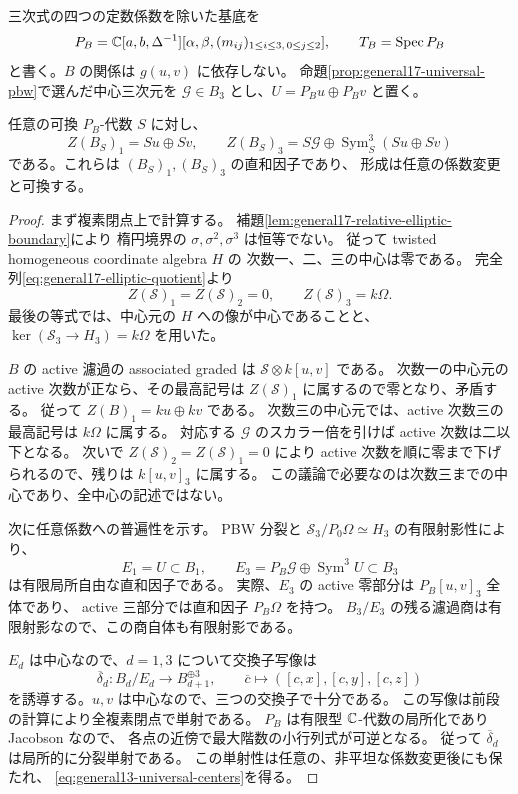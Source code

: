 三次式の四つの定数係数を除いた基底を
\[
 P_B=\mathbb C[a,b,\Delta^{-1}]
       [\alpha,\beta,(m_{ij})_{1\leq i\leq3,\,0\leq j\leq2}],
 \qquad T_B=\operatorname{Spec}P_B
\]
と書く。$B$ の関係は $g(u,v)$ に依存しない。
命題\ref{prop:general17-universal-pbw}で選んだ中心三次元を
$\mathcal G\in B_3$ とし、$U=P_Bu\oplus P_Bv$ と置く。

\begin{proposition}
\label{prop:general13-universal-centers}
任意の可換 $P_B$-代数 $S$ に対し、
\begin{equation}\label{eq:general13-universal-centers}
 Z(B_S)_1=Su\oplus Sv,
 \qquad
 Z(B_S)_3=S\mathcal G\oplus\operatorname{Sym}^3_S(Su\oplus Sv)
\end{equation}
である。これらは $(B_S)_1,(B_S)_3$ の直和因子であり、
形成は任意の係数変更と可換する。
\end{proposition}

\begin{proof}
まず複素閉点上で計算する。
補題\ref{lem:general17-relative-elliptic-boundary}により
楕円境界の $\sigma,\sigma^2,\sigma^3$ は恒等でない。
従って twisted homogeneous coordinate algebra $H$ の
次数一、二、三の中心は零である。
完全列\eqref{eq:general17-elliptic-quotient}より
\[
 Z(\mathscr S)_1=Z(\mathscr S)_2=0,
 \qquad Z(\mathscr S)_3=k\Omega.
\]
最後の等式では、中心元の $H$ への像が中心であることと、
$\ker(\mathscr S_3\to H_3)=k\Omega$ を用いた。

$B$ の active 濾過の associated graded は
$\mathscr S\otimes k[u,v]$ である。
次数一の中心元の active 次数が正なら、その最高記号は
$Z(\mathscr S)_1$ に属するので零となり、矛盾する。
従って $Z(B)_1=ku\oplus kv$ である。
次数三の中心元では、active 次数三の最高記号は $k\Omega$ に属する。
対応する $\mathcal G$ のスカラー倍を引けば active 次数は二以下となる。
次いで $Z(\mathscr S)_2=Z(\mathscr S)_1=0$ により
active 次数を順に零まで下げられるので、残りは $k[u,v]_3$ に属する。
この議論で必要なのは次数三までの中心であり、全中心の記述ではない。

次に任意係数への普遍性を示す。
PBW 分裂と
$\mathscr S_3/P_0\Omega\simeq H_3$ の有限射影性により、
\[
 E_1=U\subset B_1,
 \qquad E_3=P_B\mathcal G\oplus\operatorname{Sym}^3U\subset B_3
\]
は有限局所自由な直和因子である。
実際、$E_3$ の active 零部分は $P_B[u,v]_3$ 全体であり、
active 三部分では直和因子 $P_B\Omega$ を持つ。
$B_3/E_3$ の残る濾過商は有限射影なので、この商自体も有限射影である。

$E_d$ は中心なので、$d=1,3$ について交換子写像は
\[
 \overline\delta_d:B_d/E_d\longrightarrow B_{d+1}^{\oplus3},
 \qquad \overline c\longmapsto([c,x],[c,y],[c,z])
\]
を誘導する。$u,v$ は中心なので、三つの交換子で十分である。
この写像は前段の計算により全複素閉点で単射である。
$P_B$ は有限型 $\mathbb C$-代数の局所化であり Jacobson なので、
各点の近傍で最大階数の小行列式が可逆となる。
従って $\overline\delta_d$ は局所的に分裂単射である。
この単射性は任意の、非平坦な係数変更後にも保たれ、
\eqref{eq:general13-universal-centers}を得る。
\end{proof}

